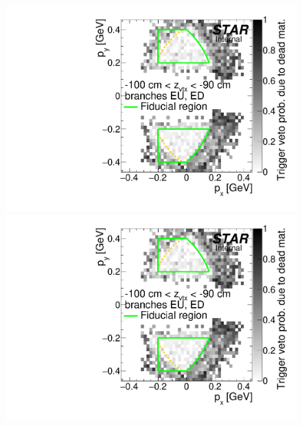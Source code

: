 \begin{figure}[hb]
{  \includegraphics[width=\linewidth,page=4]{graphics/corrections/mcDeadMatProbPxPy.pdf}\\
  \includegraphics[width=\linewidth,page=6]{graphics/corrections/mcDeadMatProbPxPy.pdf}
}%
\end{figure}
